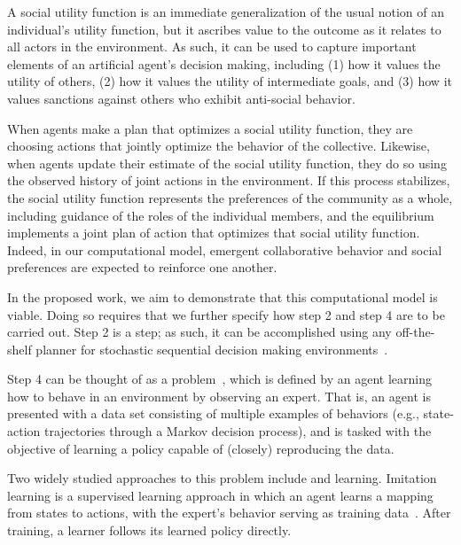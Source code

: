 A social utility function is an immediate generalization of the usual
notion of an individual's utility function, but it ascribes value to
the outcome as it relates to all actors in the environment.
%
%
As such, it can be used to capture important elements of an artificial
agent's decision making, including (1) how it values the utility of
others, (2) how it values the utility of intermediate goals, and (3)
how it values sanctions against others who exhibit anti-social behavior.

When agents make a plan that optimizes a social utility function, they
are choosing actions that jointly optimize the behavior of the
collective.
Likewise, when
agents update their estimate of the social utility function, they do
so using the observed history of joint actions in the environment.
If this process stabilizes, the social utility function represents the
preferences of the community as a whole, including guidance of
the roles of the individual members, and the equilibrium
implements a joint plan of action that optimizes that social utility
function.  Indeed, in our computational model, emergent collaborative
behavior and social preferences are expected to reinforce one another.

In the proposed work, we aim to demonstrate that this computational
model is viable.  Doing so requires that we further specify how step 2
and step 4 are to be carried out.  Step 2 is a  step;
as such, it can be accomplished using any off-the-shelf planner for
stochastic sequential decision making environments~\cite{Barto95,bellman57,boutilier99,collins95,kearns99b,kocsis06}.

Step 4 can be thought of as a 
problem~\cite{argall09}, which is defined by an agent learning how to
behave in an environment by observing an expert.  That is, an agent is
presented with a data set consisting of multiple examples of behaviors
(e.g., state-action trajectories through a Markov decision process),
and is tasked with the objective of learning a policy capable of
(closely) reproducing the data.

Two widely studied approaches to this problem include
 and  learning.  Imitation learning
is a supervised learning approach in which an agent learns a mapping
from states to actions, with the expert's behavior serving as training
data~\cite{pomerleau93}.  After training, a learner follows its
learned policy directly.

